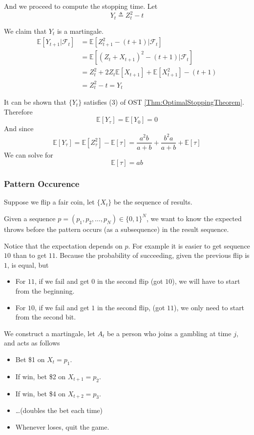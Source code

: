             And we proceed to compute the stopping time. Let
            \[ Y_t \triangleq Z_t^2 - t \]

            We claim that $Y_t$ is a martingale.
            \begin{align*}
                \mathbb{E}[Y_{t+1}|\mathcal{F}_t] &= \mathbb{E}[Z_{t+1}^2 - (t+1)|\mathcal{F}_t]\\
                &= \mathbb{E}[(Z_t + X_{t+1})^2 - (t+1) | \mathcal{F}_t]\\
                &= Z_t^2 + 2Z_t\mathbb{E}[X_{t+1}] + \mathbb{E}[X_{t+1}^2] - (t+1)\\
                &= Z_t^2 - t = Y_t
            \end{align*}

            It can be shown that $\{Y_t\}$ satisfies (3) of OST \ref{Thm:OptimalStoppingTheorem}. Therefore
            \[ \mathbb{E}[Y_{\tau}] = \mathbb{E}[Y_0] = 0 \]
            And since
            \[ \mathbb{E}[Y_{\tau}] = \mathbb{E}[Z_{\tau}^2] - \mathbb{E}[\tau] = \frac{a^2b}{a+b} + \frac{b^2a}{a+b} + \mathbb{E}[\tau] \]
            We can solve for
            \[ \mathbb{E}[\tau] = ab \]

        \subsubsection{Pattern Occurence}
            Suppose we flip a fair coin, let $\{X_t\}$ be the sequence of results. 
            
            Given a sequence $p = (p_1,p_2,\dots,p_N) \in \{0,1\}^N$, we want to know the expected throws before the pattern occurs (as a subsequence) in the result sequence.

            Notice that the expectation depends on $p$. For example it is easier to get sequence $10$ than to get $11$. Because the probability of succeeding, given the previous flip is $1$, is equal, but
            \begin{itemize}
                \item For $11$, if we fail and get $0$ in the second flip (got $10$), we will have to start from the beginning.
                \item For $10$, if we fail and get $1$ in the second flip, (got $11$), we only need to start from the second bit.
            \end{itemize}

            We construct a martingale, let $A_t$ be a person who joins a gambling at time $j$, and acts as follows
            \begin{itemize}
                \item Bet \$1 on $X_t=p_1$.
                \item If win, bet \$2 on $X_{t+1}=p_2$.
                \item If win, bet \$4 on $X_{t+2}=p_3$.
                \item \dots (doubles the bet each time)
                \item Whenever loses, quit the game.
            \end{itemize}

